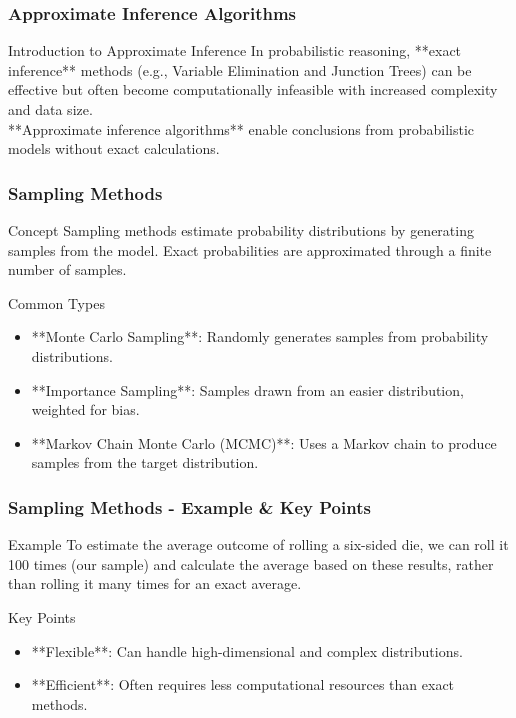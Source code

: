 \documentclass[aspectratio=169]{beamer}
\begin{document}
\begin{frame}[fragile]
  \frametitle{Approximate Inference Algorithms}
  \begin{block}{Introduction to Approximate Inference}
    In probabilistic reasoning, **exact inference** methods (e.g., Variable Elimination and Junction Trees) can be effective but often become computationally infeasible with increased complexity and data size. 
    \\[1em]
    **Approximate inference algorithms** enable conclusions from probabilistic models without exact calculations.
  \end{block}
\end{frame}

\begin{frame}[fragile]
  \frametitle{Sampling Methods}
  \begin{block}{Concept}
    Sampling methods estimate probability distributions by generating samples from the model. Exact probabilities are approximated through a finite number of samples.
  \end{block}

  \begin{block}{Common Types}
    \begin{itemize}
      \item **Monte Carlo Sampling**: Randomly generates samples from probability distributions.
      \item **Importance Sampling**: Samples drawn from an easier distribution, weighted for bias.
      \item **Markov Chain Monte Carlo (MCMC)**: Uses a Markov chain to produce samples from the target distribution.
    \end{itemize}
  \end{block}
\end{frame}

\begin{frame}[fragile]
  \frametitle{Sampling Methods - Example & Key Points}
  \begin{block}{Example}
    To estimate the average outcome of rolling a six-sided die, we can roll it 100 times (our sample) and calculate the average based on these results, rather than rolling it many times for an exact average.
  \end{block}

  \begin{block}{Key Points}
    \begin{itemize}
      \item **Flexible**: Can handle high-dimensional and complex distributions.
      \item **Efficient**: Often requires less computational resources than exact methods.
    \end{itemize}
  \end{block}
\end{frame}
\end{document}
